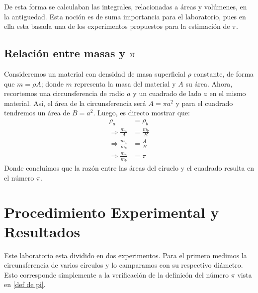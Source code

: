 \documentclass[10pt,a4paper]{article}
\begin{document}
\begin{multicols}{2}
		De esta forma se calculaban las integrales, relacionadas a áreas y volúmenes, en la antiguedad. Esta noción es de suma importancia para el laboratorio, pues en ella esta basada una de los experimentos propuestos para la estimación de $\pi$.
		\subsection*{Relación entre masas y $\pi$}
		Consideremos un material con densidad de masa superficial $\rho$ constante, de forma que $m = \rho A$; donde $m$ representa la masa del material y  $A$ su área. Ahora, recortemos una circunsferencia de radio $a$ y un cuadrado de lado $a$ en el mismo material. Así, el área de la circunsferencia será $A = \pi a^2$ y para el cuadrado tendremos un área de $B = a^2$. Luego, es directo mostrar que:
		\begin{align}
		\rho_a &= \rho_b \\
		\Longrightarrow \frac{m_a}{A} &= \frac{m_b}{B}\\
		\Longrightarrow \frac{m_a}{m_b} &= \frac{A}{B}\\
		\Longrightarrow \frac{m_a}{m_b} &= \pi \label{masa pi}
		\end{align}
		Donde concluímos que la razón entre las áreas del círuclo y el cuadrado resulta en el número $\pi$. \\
		\section{Procedimiento Experimental y Resultados}
		Este laboratorio esta dividido en dos experimentos. Para el primero medimos la circunsferencia de varios círculos y lo camparamos con su respectivo diámetro. Esto corresponde simplemente a la verificación de la definicón del número $\pi$ vista en \ref{def de pi}.\\
		

\end{multicols}
\end{document}
